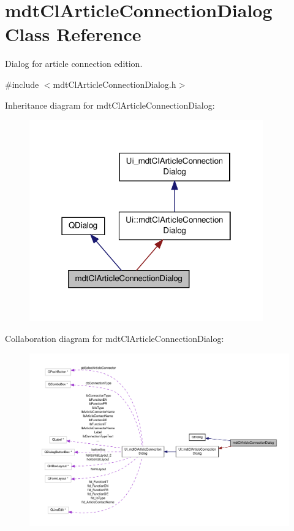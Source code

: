 \hypertarget{classmdt_cl_article_connection_dialog}{\section{mdt\-Cl\-Article\-Connection\-Dialog Class Reference}
\label{classmdt_cl_article_connection_dialog}
}


Dialog for article connection edition.  




{\ttfamily \#include $<$mdt\-Cl\-Article\-Connection\-Dialog.\-h$>$}



Inheritance diagram for mdt\-Cl\-Article\-Connection\-Dialog\-:\nopagebreak
\begin{figure}[H]
\begin{center}
\leavevmode
\includegraphics[width=286pt]{classmdt_cl_article_connection_dialog__inherit__graph}
\end{center}
\end{figure}


Collaboration diagram for mdt\-Cl\-Article\-Connection\-Dialog\-:\nopagebreak
\begin{figure}[H]
\begin{center}
\leavevmode
\includegraphics[width=350pt]{classmdt_cl_article_connection_dialog__coll__graph}
\end{center}
\end{figure}
